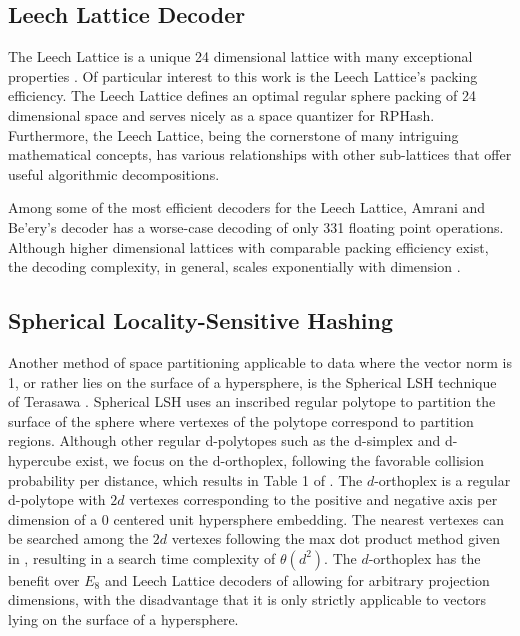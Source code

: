 \subsection{Leech Lattice Decoder}

The Leech Lattice is a unique 24 dimensional lattice with many exceptional properties \cite{Curtis,SPLAG}.  Of
particular interest to this work is the Leech Lattice's packing efficiency.  The Leech Lattice defines an optimal
regular sphere packing of 24 dimensional space \cite{leech} and serves nicely as a space quantizer for
\textsf{RPHash}.  Furthermore, the Leech Lattice, being the cornerstone of many intriguing mathematical
concepts, has various relationships with other sub-lattices that offer useful algorithmic decompositions.

Among some of the most efficient decoders for the Leech Lattice, Amrani and Be'ery's \cite{Amrani} decoder has a
worse-case decoding of only 331 floating point operations.  Although higher dimensional lattices with comparable packing
efficiency exist, the decoding complexity, in general, scales exponentially with dimension \cite{Tarokh1,Agrell}.

\subsection{Spherical Locality-Sensitive Hashing}

Another method of space partitioning applicable to data where the vector norm is 1, or rather lies on the surface of a
hypersphere, is the Spherical LSH technique of Terasawa \cite{SLSH}.  Spherical LSH uses an inscribed regular polytope
to partition the surface of the sphere where vertexes of the polytope correspond to partition regions.  Although other
regular d-polytopes such as the d-simplex and d-hypercube exist, we focus on the d-orthoplex, following the favorable
collision probability per distance, which results in Table 1 of \cite{SLSH}.  The $d$-orthoplex is a regular d-polytope
with $2d$ vertexes corresponding to the positive and negative axis per dimension of a $0$ centered unit hypersphere
embedding.  The nearest vertexes can be searched among the $2d$ vertexes following the max dot product method given in
\cite{SLSH}, resulting in a search time complexity of $\theta (d^2)$.  The $d$-orthoplex has the benefit over $E_8$ and
Leech Lattice decoders of allowing for arbitrary projection dimensions, with the disadvantage that it is only strictly
applicable to vectors lying on the surface of a hypersphere.

